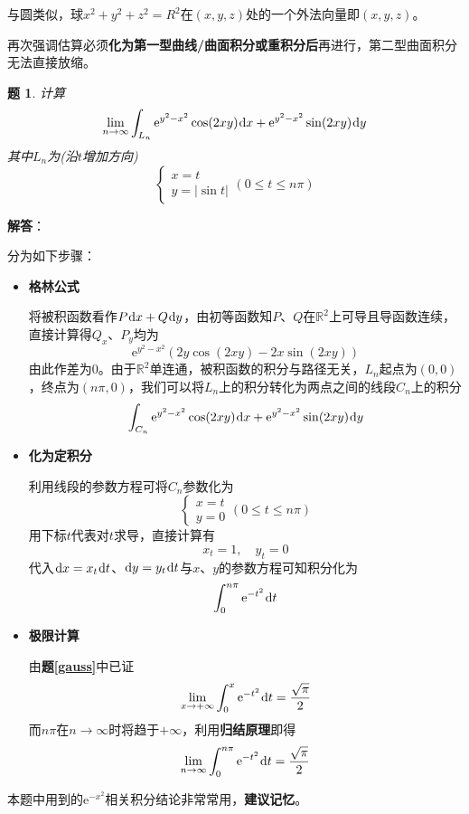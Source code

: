\documentclass[a4paper,UTF8,fontset=windows,AutoFakeBold]{ctexart}
\newcommand*{\dr}{\hspace{0.07em}\mathrm{d}}
\newcommand*{\er}{\mathrm{e}}
\newcommand*{\rb}{\mathbb{R}}
\newcommand*{\note}{\noindent *}
\theoremstyle{ex}
\newtheorem{exercise}{题}
\newcommand{\exref}[1]{\textbf{题\;\ref{#1}\;}}
\newcommand{\sol}[1]{{\vspace{5pt}\kaishu\noindent\textbf{解答}：\vspace{-3pt}
\begin{compactitem}
    \item[] #1
\end{compactitem}
}}
\begin{document}
\note 与圆类似，球$x^2+y^2+z^2=R^2$在$(x,y,z)$处的一个外法向量即$(x,y,z)$。

\note 再次强调估算必须\textbf{化为第一型曲线/曲面积分或重积分后}再进行，第二型曲面积分无法直接放缩。

\begin{framed}
\begin{exercise}
    计算
    $$\lim_{n\to\infty}\int_{L_n}\er^{y^2-x^2}\cos(2xy)\dr x+\er^{y^2-x^2}\sin(2xy)\dr y$$
    其中$L_n$为(沿$t$增加方向)
    $$\begin{cases}x=t\\y=|\sin t|\end{cases}(0\le t\le n\pi)$$
\end{exercise}
\sol{
    分为如下步骤：
    \begin{itemize}
        \item \textbf{格林公式}
        
        将被积函数看作$P\dr x+Q\dr y$，由初等函数知$P$、$Q$在$\rb^2$上可导且导函数连续，直接计算得$Q_x$、$P_y$均为
        $$\er^{y^2-x^2}(2y\cos(2xy)-2x\sin(2xy))$$
        由此作差为0。由于$\rb^2$单连通，被积函数的积分与路径无关，$L_n$起点为$(0,0)$，终点为$(n\pi,0)$，我们可以将$L_n$上的积分转化为两点之间的线段$C_n$上的积分
        $$\int_{C_n}\er^{y^2-x^2}\cos(2xy)\dr x+\er^{y^2-x^2}\sin(2xy)\dr y$$
        
        \item \textbf{化为定积分}
        
        利用线段的参数方程可将$C_n$参数化为
        $$\begin{cases}x=t\\y=0\end{cases}(0\le t\le n\pi)$$
        用下标$t$代表对$t$求导，直接计算有
        $$x_t=1,\quad y_t=0$$
        代入$\dr x=x_t\dr t$、$\dr y=y_t\dr t$与$x$、$y$的参数方程可知积分化为
        $$\int_0^{n\pi}\er^{-t^2}\dr t$$

        \item \textbf{极限计算}
        
        由\exref{gauss}中已证
        $$\lim_{x\to+\infty}\int_0^x\er^{-t^2}\dr t=\frac{\sqrt\pi}{2}$$
        而$n\pi$在$n\to\infty$时将趋于$+\infty$，利用\textbf{归结原理}即得
        $$\lim_{n\to\infty}\int_0^{n\pi}\er^{-t^2}\dr t=\frac{\sqrt\pi}{2}$$
    \end{itemize}
}
\end{framed}

\note 本题中用到的$\er^{-x^2}$相关积分结论非常常用，\textbf{建议记忆}。
\end{document}
